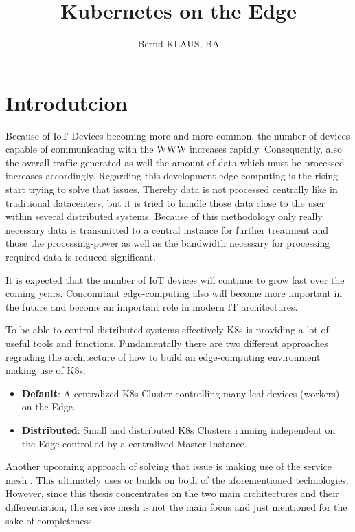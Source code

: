 \documentclass[MSC,Master,english]{twbook}%
\title{Kubernetes on the Edge}
\author{Bernd KLAUS, BA}
\begin{document}
\maketitle
\chapter{Introdutcion}
\label{chap:introduction}
Because of \ac{IoT} Devices becoming more and more common, the number of devices capable of communicating with the \ac{WWW} increases rapidly. Consequently, also the overall traffic generated as well the amount of data which must be processed increases accordingly. Regarding this development edge-computing is the rising start trying to solve that issues. Thereby data is not processed centrally like in traditional datacenters, but it is tried to handle those data close to the user within several distributed systems. Because of this methodology only really necessary data is transmitted to a central instance for further treatment and those the processing-power as well as the bandwidth necessary for processing required data is reduced significant. \par It is expected that the number of IoT devices will continue to grow fast \cite{SotE21} over the coming years. Concomitant edge-computing also will become more important in the future and become an important role in modern \ac{IT} architectures. \par To be able to control distributed systems effectively \ac{K8s} is providing a lot of useful tools and functions. Fundamentally there are two different approaches regrading the architecture of how to build an edge-computing environment making use of \ac{K8s}:

\begin{itemize}
    \label{item:architecture}
    \item \textbf{Default}: A centralized \ac{K8s} Cluster controlling many leaf-devices (workers) on the Edge.
    \item \textbf{Distributed}: Small and distributed \ac{K8s} Clusters running independent on the Edge controlled by a centralized Master-Instance.
\end{itemize}

Another upcoming approach of solving that issue is making use of the service mesh \cite{servicemesh}. This ultimately uses or builds on both of the aforementioned technologies. However, since this thesis concentrates on the two main architectures and their differentiation, the service mesh is not the main focus and just mentioned for the sake of completeness.
\end{document}
